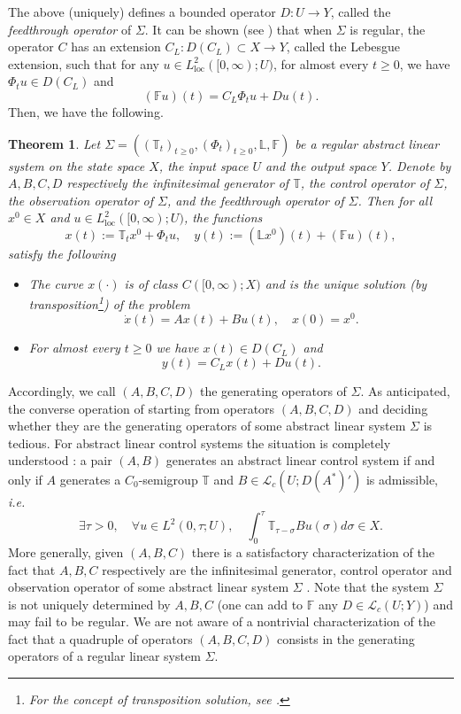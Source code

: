 \documentclass[10pt]{article}
\newcommand{\oploc}{\operatorname{loc}}
\newtheorem{Theorem}{Theorem}[section]
\begin{document}
The above (uniquely) defines a bounded operator $D : U \to Y$, called the \textit{feedthrough operator} of $\Sigma$. It can be shown  (see \cite[Theorem 4.5]{weiss_representation}) that when $\Sigma$ is regular, the operator $C$ has an extension $C_L : D(C_L) \subset X \to Y$, called the Lebesgue extension, such that for any $u \in L^2_{\oploc}([0,\infty);U)$, for almost every $t \geq 0$, we have $\Phi_t u \in D(C_L)$ and
\[
(\mathbb{F}u)(t) = C_L \Phi_t u + Du(t). 
\]
Then, we have the following.
\begin{Theorem}{\cite[Theorem 4.6]{weiss_representation}}
Let $\Sigma = ((\mathbb{T}_t)_{t \geq 0},(\Phi_t)_{t \geq 0},\mathbb{L}, \mathbb{F})$ be a regular abstract linear system on the state space $X$, the input space $U$ and the output space $Y$. Denote by $A,B,C,D$ respectively the infinitesimal generator of $\mathbb{T}$, the control operator of $\Sigma$, the observation operator of $\Sigma$, and the feedthrough operator of $\Sigma$. Then for all $x^0 \in X$ and $u \in L^2_{\oploc}([0,\infty);U)$, the functions 
\[
x(t) := \mathbb{T}_t x^0 + \Phi_t u,\quad y(t) := (\mathbb{L}x^0)(t) + (\mathbb{F}u)(t),
\]
satisfy the following 
\begin{itemize}
    \item The curve $x(\cdot)$ is of class $C([0,\infty);X)$ and is the unique solution (by transposition\footnote{For the concept of transposition solution, see \cite[\S 2.3.1]{Coron}. }) of the problem 
    \[
    \dot{x}(t) = Ax(t) + Bu(t),\quad x(0) = x^0.
    \]
    \item For almost every $t \geq 0$ we have $x(t) \in D(C_L)$ and 
    \[
    y(t) = C_L x(t) + Du(t). 
    \]
\end{itemize}
\end{Theorem}
Accordingly, we call $(A,B,C,D)$ the generating operators of $\Sigma$. As anticipated, the converse operation of starting from operators $(A,B,C,D)$ and deciding whether they are the generating operators of some abstract linear system $\Sigma$ is tedious. For abstract linear control systems the situation is completely understood \cite{weiss_representation}: a pair $(A,B)$ generates an abstract linear control system if and only if $A$ generates a $C_0$-semigroup $\mathbb{T}$ and $B \in \mathcal{L}_c(U;D(A^*)')$ is admissible, \textit{i.e.}
\[
\exists \tau > 0,\quad \forall u \in L^2(0,\tau;U),\quad \int_0^\tau \mathbb{T}_{\tau-\sigma} Bu(\sigma) d\sigma \in X.
\]
More generally, given $(A,B,C)$ there is a satisfactory characterization of the fact that $A,B,C$ respectively are the infinitesimal generator, control operator and observation operator of some abstract linear system $\Sigma$ \cite[Theorem 5.1]{curtain_weiss_triple}. Note that the system $\Sigma$ is not uniquely determined by $A,B,C$ (one can add to $\mathbb{F}$ any $D \in \mathcal{L}_c(U;Y)$) and may fail to be regular. We are not aware of a nontrivial characterization of the fact that a quadruple of operators $(A,B,C,D)$ consists in the generating operators of a regular linear system $\Sigma$. 
\end{document}
